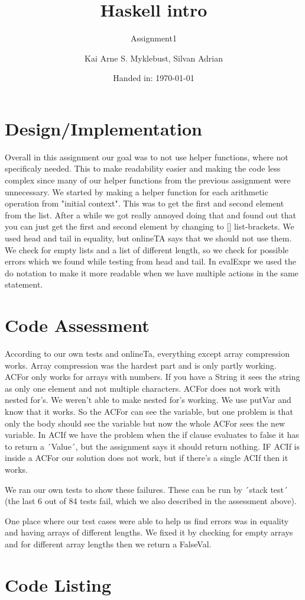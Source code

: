 \documentclass[12pt,a4paper]{article}
\begin{document}
\title{Haskell intro}
\subtitle{Assignment1}

\author{Kai Arne S. Myklebust, Silvan Adrian}
\date{Handed in: \today}
	
\maketitle
\tableofcontents

\section{Design/Implementation}

Overall in this assignment our goal was to not use helper functions, where not specificaly needed. This to make readability easier and making the code less complex since many of our helper functions from the previous assignment were unnecessary.
We started by making a helper function for each arithmetic operation from "initial context". This was to get the first and second element from the list. After a while we got really annoyed doing that and found out that you can just get the first and second element by changing to [] list-brackets.
We used head and tail in equality, but onlineTA says that we should not use them. We check for empty lists and a list of different length, so we check for possible errors which we found while testing from head and tail.
In evalExpr we used the do notation to make it more readable when we have multiple actions in the same statement. 

\section{Code Assessment}
According to our own tests and onlineTa, everything except array compression works.
Array compression was the hardest part and is only partly working. ACFor only works for arrays with numbers. If you have a String it sees the string as only one element and not multiple characters. ACFor does not work with nested for's. We weren't able to make nested for's working. We use putVar and know that it works. So the ACFor can see the variable, but one problem is that only the body should see the variable but now the whole ACFor sees the new variable.
In ACIf we have the problem when the if clause evaluates to false it has to return a ´Value´, but the assignment says it should return nothing. IF ACIf is inside a ACFor our solution does not work, but if there's a single ACIf then it works.

We ran our own tests to show these failures. These can be run by ´stack test´ (the last 6 out of 84 tests fail, which we also described in the assessment above). 

One place where our test cases were able to help us find errors was in equality and having arrays of different lengths. We fixed it by checking for empty arrays and for different array lengths then  we return a FalseVal.

\appendix
\section{Code Listing}

\inputminted{haskell}{handin/src/SubsInterpreter.hs}
\end{document}
